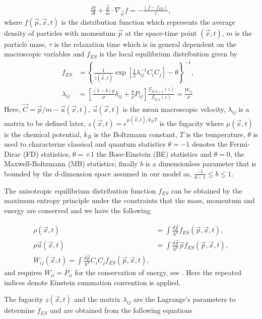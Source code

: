 \documentclass[doublecol]{epl2}
\begin{document}
\begin{align}
\frac{\partial f}{\partial t} + \frac{\vec p}{m} \cdot \nabla_{\vec x} f  =  -\frac{(f - f_{ES})}{\tau},
\end{align}
where  $f(\vec p, \vec x, t)$ is the distribution function which represents the average density of particles with momentum $\vec p$ at the space-time point $(\vec x, t)$, $m$ is the particle mass, $\tau$ is the relaxation time which is in general dependent on the macroscopic variables and $f_{ES}$ is the local equilibrium distribution given by
\begin{align}
f_{ES} &=\left\{ \frac{1}{z(\vec x,t)} \exp[ \frac{1}{2} \lambda_{i j}^{-1} C_{i} C_{j} ] - \theta \right\}^{-1}, \\
\lambda_{i j} &= \left[\frac{(1-b)p}{\rho} \delta_{i j}+ \frac{b}{\rho}P_{i j } \right] \frac{\mathcal{G}_{d/2+1}(z)}{\mathcal{G}_{d/2}(z)} = \frac{W_{i j}}{\rho}&
\end{align}
Here, $\vec C=\vec p/m -\vec u(\vec x,t)$, $\vec u(\vec x,t)$ is the mean macroscopic velocity, $\lambda_{i j}$ is a matrix to be defined later, $z(\vec x, t)= e^{ \mu(\vec x, t) /k_B T }$ is the fugacity where $\mu(\vec x,t)$ is the chemical potential, $k_B$ is the Boltzmann constant, $T$ is the temperature, $\theta$ is used to characterize classical and quantum statistics $\theta = -1$ denotes the Fermi-Dirac (FD) statistics, $\theta = +1$ the Bose-Einstein (BE) statistics and $\theta = 0$, the Maxwell-Boltzmann (MB) statistics; finally $b$ is a dimensionless parameter that is bounded by the d-dimension space assumed in our model as, $\frac{-1}{d-1} \le b \le 1$.

The anisotropic equilibrium distribution function $f_{ES}$ can be obtained by the maximum entropy principle under the constraints that the mass, momentum and energy are conserved and we have the following

\begin{align}
\rho(\vec x, t) &= \int \frac{d \vec p}{h^d}   f_{ES}(\vec p, \vec x, t), \\
\rho \vec u(\vec x, t) &= \int \frac{d \vec p}{h^d} \vec p  f_{ES}(\vec p, \vec x, t), \\
W_{i j}(\vec x, t) = \int \frac{d \vec p}{h^d} C_{i} C_{j} f_{ES}(\vec p, \vec x, t),
\end{align}
and requires $W_{i i}=P_{i i}$ for the conservation of energy, see \cite{Wu2012}.
Here the repeated indices denote Einstein summation convention is applied.

The fugacity $z(\vec x,t)$ and the matrix $\lambda_{i j}$ are the Lagrange's parameters to determine $f_{ES}$ and are obtained from the following equations
\end{document}
